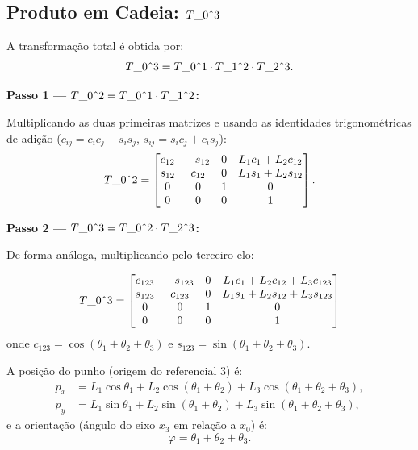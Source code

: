 \documentclass[12pt,a4paper]{article}
\def\Trans#1#2{T\string_#1\string^#2}%
\newcommand{\Trans}[2]{{}^{#1}_{#2}\!\mathbf{T}}
\begin{document}
\subsection{Produto em Cadeia: $\Trans{0}{3}$}

A transforma\c{c}\~ao total \'e obtida por:
\[
  \Trans{0}{3} = \Trans{0}{1} \cdot \Trans{1}{2} \cdot \Trans{2}{3}.
\]

\textbf{Passo 1 --- $\Trans{0}{2} = \Trans{0}{1}\cdot\Trans{1}{2}$:}

Multiplicando as duas primeiras matrizes e usando as identidades trigonom\'etricas de adi\c{c}\~ao
($c_{ij}=c_ic_j-s_is_j$, $s_{ij}=s_ic_j+c_is_j$):
\[
  \Trans{0}{2} =
  \begin{bmatrix}
    c_{12} & -s_{12} & 0 & L_1 c_1 + L_2 c_{12} \\
    s_{12} &  c_{12} & 0 & L_1 s_1 + L_2 s_{12} \\
    0      &  0      & 1 & 0                     \\
    0      &  0      & 0 & 1
  \end{bmatrix}.
\]

\textbf{Passo 2 --- $\Trans{0}{3} = \Trans{0}{2}\cdot\Trans{2}{3}$:}

De forma an\'aloga, multiplicando pelo terceiro elo:

\begin{tcolorbox}[resultbox, title=Cinem\'atica Direta do Bra\c{c}o Planar 3R]
\[
  \Trans{0}{3} =
  \begin{bmatrix}
    c_{123} & -s_{123} & 0 & L_1 c_1 + L_2 c_{12} + L_3 c_{123} \\
    s_{123} &  c_{123} & 0 & L_1 s_1 + L_2 s_{12} + L_3 s_{123} \\
    0       &  0       & 1 & 0                                    \\
    0       &  0       & 0 & 1
  \end{bmatrix}
\]
onde $c_{123}\!=\!\cos(\theta_1{+}\theta_2{+}\theta_3)$ e $s_{123}\!=\!\sin(\theta_1{+}\theta_2{+}\theta_3)$.
\end{tcolorbox}

A posi\c{c}\~ao do punho (origem do referencial 3) \'e:
\begin{align}
  p_x &= L_1 \cos\theta_1 + L_2 \cos(\theta_1+\theta_2) + L_3 \cos(\theta_1+\theta_2+\theta_3), \label{eq:px}\\
  p_y &= L_1 \sin\theta_1 + L_2 \sin(\theta_1+\theta_2) + L_3 \sin(\theta_1+\theta_2+\theta_3), \label{eq:py}
\end{align}
e a orienta\c{c}\~ao (\'angulo do eixo $x_3$ em rela\c{c}\~ao a $x_0$) \'e:
\[
  \varphi = \theta_1 + \theta_2 + \theta_3.
\]
\end{document}
